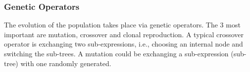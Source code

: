 \subsubsection{Genetic Operators}
The evolution of the population takes place via genetic operators. The 3 most important are mutation, crossover and clonal reproduction. A typical crossover operator is exchanging two sub-expressions, i.e., choosing an internal node and switching the sub-trees. A mutation could be exchanging a sub-expression (sub-tree) with one randomly generated.\\




